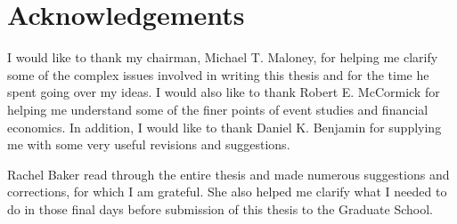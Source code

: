 \chapter*{Acknowledgements}

I would like to thank my chairman, Michael T. Maloney, for
helping me clarify some of the complex issues involved in
writing this thesis and for the time he spent going over 
my ideas.  I would also like to thank Robert E. McCormick
for helping me understand some of the finer points of event
studies and financial economics.
In addition, I would like to thank Daniel K. Benjamin for supplying
me with some very useful revisions and suggestions.

Rachel Baker read through the entire thesis and made
numerous suggestions and corrections, for which I am
grateful.
She also helped me clarify what I needed to do in those
final days before submission of this thesis to the Graduate
School.
